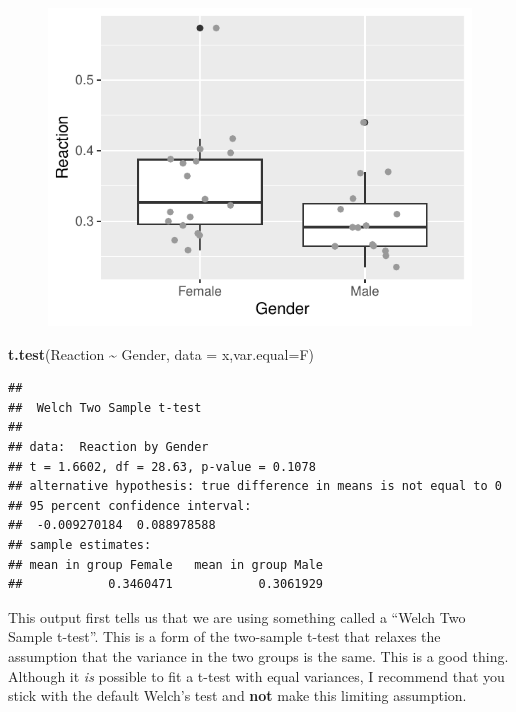 \documentclass[
  a4paperpaper,
]{book}
\newenvironment{Shaded}{\begin{snugshade}}{\end{snugshade}}
\newcommand{\DataTypeTok}[1]{\textcolor[rgb]{0.13,0.29,0.53}{#1}}
\newcommand{\KeywordTok}[1]{\textcolor[rgb]{0.13,0.29,0.53}{\textbf{#1}}}
\newcommand{\NormalTok}[1]{#1}
\newcommand{\OperatorTok}[1]{\textcolor[rgb]{0.81,0.36,0.00}{\textbf{#1}}}
\newcommand{\StringTok}[1]{\textcolor[rgb]{0.31,0.60,0.02}{#1}}
\begin{document}
\begin{figure}[ht]

{\centering \includegraphics{BB852_files/figure-latex/reactionData-1} 

}

\end{figure}

\begin{Shaded}
\begin{Highlighting}[]
\KeywordTok{t.test}\NormalTok{(Reaction }\OperatorTok{\textasciitilde{}}\StringTok{ }\NormalTok{Gender, }\DataTypeTok{data =}\NormalTok{ x,}\DataTypeTok{var.equal=}\NormalTok{F)}
\end{Highlighting}
\end{Shaded}

\begin{verbatim}
## 
## 	Welch Two Sample t-test
## 
## data:  Reaction by Gender
## t = 1.6602, df = 28.63, p-value = 0.1078
## alternative hypothesis: true difference in means is not equal to 0
## 95 percent confidence interval:
##  -0.009270184  0.088978588
## sample estimates:
## mean in group Female   mean in group Male 
##            0.3460471            0.3061929
\end{verbatim}

This output first tells us that we are using something called a ``Welch Two Sample t-test''. This is a form of the two-sample t-test that relaxes the assumption that the variance in the two groups is the same. This is a good thing. Although it \emph{is} possible to fit a t-test with equal variances, I recommend that you stick with the default Welch's test and \textbf{not} make this limiting assumption.
\end{document}
